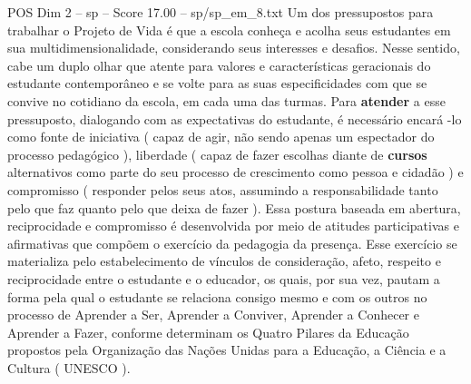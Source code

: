\begin{textsample}{POS Dim 2 – sp – Score 17.00 – sp/sp\_em\_8.txt}
Um dos pressupostos para trabalhar o Projeto de Vida é que a escola conheça e acolha seus estudantes em sua multidimensionalidade, considerando seus interesses e desafios.
Nesse sentido, cabe um duplo olhar que atente para valores e características geracionais do estudante contemporâneo e se volte para as suas especificidades com que se convive no cotidiano da escola, em cada uma das turmas.
Para \textbf{atender} a esse pressuposto, dialogando com as expectativas do estudante, é necessário encará -lo como fonte de iniciativa ( capaz de agir, não sendo apenas um espectador do processo pedagógico ), liberdade ( capaz de fazer escolhas diante de \textbf{cursos} alternativos como parte do seu processo de crescimento como pessoa e cidadão ) e compromisso ( responder pelos seus atos, assumindo a responsabilidade tanto pelo que faz quanto pelo que deixa de fazer ).
Essa postura baseada em abertura, reciprocidade e compromisso é desenvolvida por meio de atitudes participativas e afirmativas que compõem o exercício da pedagogia da presença.
Esse exercício se materializa pelo estabelecimento de vínculos de consideração, afeto, respeito e reciprocidade entre o estudante e o educador, os quais, por sua vez, pautam a forma pela qual o estudante se relaciona consigo mesmo e com os outros no processo de Aprender a Ser, Aprender a Conviver, Aprender a Conhecer e Aprender a Fazer, conforme determinam os Quatro Pilares da Educação propostos pela Organização das Nações Unidas para a Educação, a Ciência e a Cultura ( UNESCO ).

\end{textsample}
